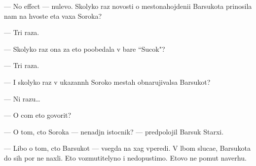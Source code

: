 \documentclass[12pt]{book}
\begin{document}
— No effect — nulevo{\y}. Skolyko raz novosti o mestonahojdeni{\y}i Barsukota prinosila nam na hvoste eta vaxa Soroka?

— Tri raza.

— Skolyko raz ona za eto poobedala v bare ``Sucok"?

— Tri raza.

— I skolyko raz v ukazann{\yi}h Soroko{\y} mestah obnarujivalsa Barsukot?

— Ni razu…

— O com eto govorit?

— O tom, cto Soroka — nenad{\e}jn{\yi}{\y} istocnik? — predpolojil Barsuk Starxi{\y}.

— Libo o tom, cto Barsukot — vsegda na xag vperedi. V l{\io}bom sluca{\y}e, Barsukota do sih por ne naxli. Eto vozmutitelyno i nedopustimo. Etovo ne po{\y}mut naverhu. 
\end{document}
